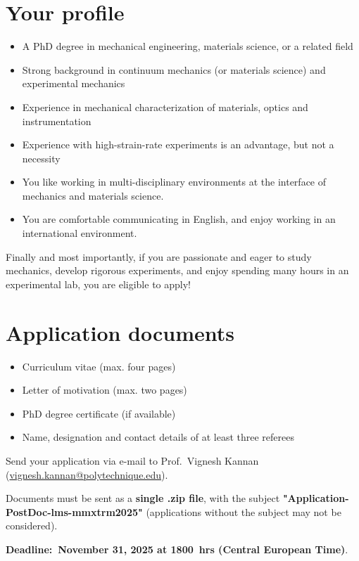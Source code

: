\documentclass[a4paper,11pt,fleqn]{article}
\begin{document}
	\section*{Your profile}
	\begin{itemize}[leftmargin=*]
		\itemsep-0.10em
		\item A PhD degree in mechanical engineering, materials science, or a related field
		\item Strong background in continuum mechanics (or materials science) and experimental mechanics
		\item Experience in mechanical characterization of materials, optics and instrumentation
		\item Experience with high-strain-rate experiments is an advantage, but not a necessity
		\item You like working in multi-disciplinary environments at the interface of mechanics and materials science.
		\item You are comfortable communicating in English, and enjoy working in an international environment.
	\end{itemize}
	\vspace{-1em}
	Finally and most importantly, if you are passionate and eager to study mechanics, develop rigorous experiments, and enjoy spending many hours in an experimental lab, you are eligible to apply!

	\section*{Application documents}
	\begin{itemize}[leftmargin=*]
		\itemsep-0.10em
		\item Curriculum vitae (max. four pages)
		\item Letter of motivation (max. two pages)
		\item  PhD degree certificate (if available)
		\item Name, designation and contact details of at least three referees
	\end{itemize}
	\begin{center}
		\vspace*{0em}
		{Send your application} via e-mail to {Prof.~Vignesh Kannan} (\href{mailto:vignesh.kannan@polytechnique.edu}{vignesh.kannan@polytechnique.edu}).
		
		Documents must be sent as a \textbf{single .zip file}, with the subject \textbf{"Application-PostDoc-lms-mmxtrm2025"} (applications without the subject may not be considered). 
		
		\textbf{Deadline:~November 31, 2025 at 1800~hrs (Central European Time)}. 
	\end{center}
\end{document}
